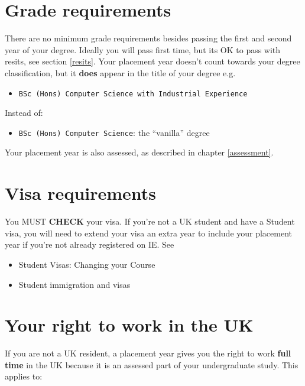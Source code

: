 \documentclass[
]{book}
\providecommand{\tightlist}{%
  \setlength{\itemsep}{0pt}\setlength{\parskip}{0pt}}
\begin{document}
\section{Grade requirements}\label{grade-requirements}

There are no minimum grade requirements besides passing the first and second year of your degree. Ideally you will pass first time, but its OK to pass with resits, see section \ref{resits}. Your placement year doesn't count towards your degree classification, but it \textbf{does} appear in the title of your degree e.g.

\begin{itemize}
\tightlist
\item
  \texttt{BSc\ (Hons)\ Computer\ Science\ with\ Industrial\ Experience}
\end{itemize}

Instead of:

\begin{itemize}
\tightlist
\item
  \texttt{BSc\ (Hons)\ Computer\ Science}: the ``vanilla'' degree
\end{itemize}

Your placement year is also assessed, as described in chapter \ref{assessment}.

\section{Visa requirements}\label{visa-requirements}

You MUST \textbf{CHECK} your visa. If you're not a UK student and have a Student visa, you will need to extend your visa an extra year to include your placement year if you're not already registered on IE. See

\begin{itemize}
\tightlist
\item
  Student Visas: Changing your Course \citep{changing}
\item
  Student immigration and visas \citep{immigration}
\end{itemize}

\section{Your right to work in the UK}\label{uk}

If you are not a UK resident, a placement year gives you the right to work \textbf{full time} in the UK because it is an assessed part of your undergraduate study. \citep{righttowork, workingduringstudy} This applies to:
\end{document}
